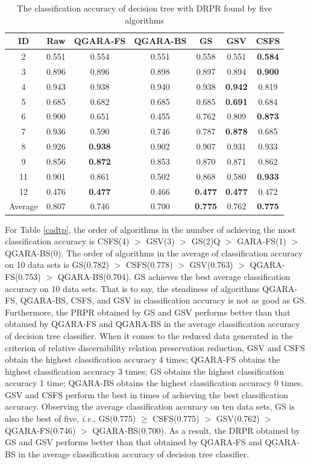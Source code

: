 \documentclass[review]{elsarticle}
\begin{document}
		\begin{table}[htb]
			\centering
			\caption{The classification accuracy of decision tree with DRPR found by five algorithms}
			\begin{tabular}{ccccccc}
				\hline%
				ID    & Raw   & QGARA-FS & QGARA-BS & GS    & GSV   & CSFS \\
				\hline%
				2     & 0.551 & 0.554 & 0.551 & 0.558 & 0.551 & \textbf{0.584} \\
				3     & 0.896 & 0.896 & 0.898 & 0.897 & 0.894 & \textbf{0.900} \\
				4     & 0.943 & 0.938 & 0.940 & 0.938 & \textbf{0.942} & 0.819 \\
				5     & 0.685 & 0.682 & 0.685 & 0.685 & \textbf{0.691} & 0.684 \\
				6     & 0.900 & 0.651 & 0.455 & 0.762 & 0.809 & \textbf{0.873} \\
				7     & 0.936 & 0.590 & 0.746 & 0.787 & \textbf{0.878} & 0.685 \\
				8     & 0.926 & \textbf{0.938} & 0.902 & 0.907 & 0.931 & 0.933 \\
				9     & 0.856 & \textbf{0.872} & 0.853 & 0.870 & 0.871 & 0.862 \\
				11    & 0.901 & 0.861 & 0.502 & 0.868 & 0.580 & \textbf{0.933} \\
				12    & 0.476 & \textbf{0.477} & 0.466 & \textbf{0.477} & \textbf{0.477} & 0.472 \\
				\hline%
				Average & 0.807 & 0.746 & 0.700 & \textbf{0.775} & 0.762 & \textbf{0.775} \\
				\hline%
			\end{tabular}%
			\label{cadtd}%
		\end{table}%
		\par For Table \ref{cadtp}, the order of algorithms in the number of achieving the most classification accuracy is CSFS(4) $> $ GSV(3) $> $ GS(2)Q $> $ GARA-FS(1) $> $ QGARA-BS(0). The order of algorithms in the average of classification accuracy on 10 data sets is GS(0.782) $> $ CSFS(0.778) $> $ GSV(0.763) $> $ QGARA-FS(0.753) $> $ QGARA-BS(0.704). GS achieves the best average classification accuracy on 10 data sets. That is to say, the steadiness of algorithms QGARA-FS, QGARA-BS, CSFS, and GSV in classification accuracy is not as good as GS. Furthermore, the PRPR obtained by GS and GSV performs better than that obtained by QGARA-FS and QGARA-BS in the average classification accuracy of decision tree classifier. 
		When it comes to the reduced data generated in the criterion of relative discernibility relation preservation reduction, GSV and CSFS obtain the highest classification accuracy 4 times; QGARA-FS obtains the highest classification accuracy 3 times; GS obtains the highest classification accuracy 1 time; QGARA-BS obtains the highest classification accuracy 0 times. GSV and CSFS perform the best in times of achieving the best classification accuracy. Observing the average classification accuracy on ten data sets, GS is also the best of five, \emph{i.e.}, GS(0.775) $\geq$ CSFS(0.775) $> $ GSV(0.762) $> $ QGARA-FS(0.746) $> $ QGARA-BS(0.700). As a result, the DRPR obtained by GS and GSV performs better than that obtained by QGARA-FS and QGARA-BS in the average classification accuracy of decision tree classifier. 
\end{document}
